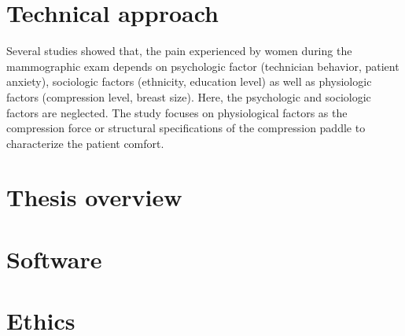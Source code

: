 \chapter*{Technical approach}\label{section:technicalapproach}
Several studies showed that, the pain experienced by women during the mammographic exam depends on psychologic factor \citep{aro_pain_1996} (technician behavior, patient anxiety), sociologic factors \citep{dullum_rates_2000} (ethnicity, education level) as well as physiologic \citep{poulos_breast_2003} factors (compression level,  breast size). Here, the psychologic and sociologic factors are neglected. The study focuses on physiological factors as the compression force or structural specifications of the compression paddle to characterize the patient comfort. 


\chapter*{Thesis overview}\label{section:thesisoverview}

\chapter*{Software}\label{section:software}
\chapter*{Ethics}\label{section:ethics}
